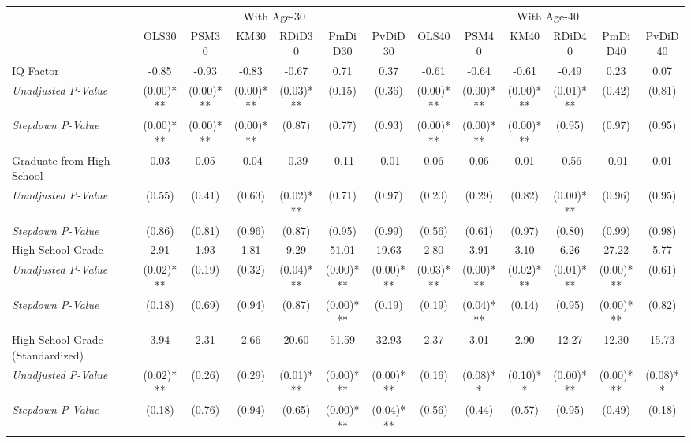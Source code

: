 \begin{tabular}{l c c c c c c c c c c c c}
\toprule
& \multicolumn{6}{c}{With Age-30} & \multicolumn{6}{c}{With Age-40} \\\cmidrule(lr){2-7} \cmidrule(lr){8-13}
 & OLS30 & PSM30 & KM30 & RDiD30 & PmDiD30 & PvDiD30 & OLS40 & PSM40 & KM40 & RDiD40 & PmDiD40 & PvDiD40 \\
\midrule
IQ Factor & -0.85 & -0.93 & -0.83 & -0.67 & 0.71 & 0.37 & -0.61 & -0.64 & -0.61 & -0.49 & 0.23 & 0.07 \\
\quad \textit{Unadjusted P-Value} & (0.00)*** & (0.00)*** & (0.00)*** & (0.03)*** & (0.15) & (0.36) & (0.00)*** & (0.00)*** & (0.00)*** & (0.01)*** & (0.42) & (0.81) \\
\quad \textit{Stepdown P-Value} & (0.00)*** & (0.00)*** & (0.00)*** & (0.87) & (0.77) & (0.93) & (0.00)*** & (0.00)*** & (0.00)*** & (0.95) & (0.97) & (0.95) \\
Graduate from High School & 0.03 & 0.05 & -0.04 & -0.39 & -0.11 & -0.01 & 0.06 & 0.06 & 0.01 & -0.56 & -0.01 & 0.01 \\
\quad \textit{Unadjusted P-Value} & (0.55) & (0.41) & (0.63) & (0.02)*** & (0.71) & (0.97) & (0.20) & (0.29) & (0.82) & (0.00)*** & (0.96) & (0.95) \\
\quad \textit{Stepdown P-Value} & (0.86) & (0.81) & (0.96) & (0.87) & (0.95) & (0.99) & (0.56) & (0.61) & (0.97) & (0.80) & (0.99) & (0.98) \\
High School Grade & 2.91 & 1.93 & 1.81 & 9.29 & 51.01 & 19.63 & 2.80 & 3.91 & 3.10 & 6.26 & 27.22 & 5.77 \\
\quad \textit{Unadjusted P-Value} & (0.02)*** & (0.19) & (0.32) & (0.04)*** & (0.00)*** & (0.00)*** & (0.03)*** & (0.00)*** & (0.02)*** & (0.01)*** & (0.00)*** & (0.61) \\
\quad \textit{Stepdown P-Value} & (0.18) & (0.69) & (0.94) & (0.87) & (0.00)*** & (0.19) & (0.19) & (0.04)*** & (0.14) & (0.95) & (0.00)*** & (0.82) \\
High School Grade (Standardized) & 3.94 & 2.31 & 2.66 & 20.60 & 51.59 & 32.93 & 2.37 & 3.01 & 2.90 & 12.27 & 12.30 & 15.73 \\
\quad \textit{Unadjusted P-Value} & (0.02)*** & (0.26) & (0.29) & (0.01)*** & (0.00)*** & (0.00)*** & (0.16) & (0.08)** & (0.10)** & (0.00)*** & (0.00)*** & (0.08)** \\
\quad \textit{Stepdown P-Value} & (0.18) & (0.76) & (0.94) & (0.65) & (0.00)*** & (0.04)*** & (0.56) & (0.44) & (0.57) & (0.95) & (0.49) & (0.18) \\

\end{tabular}
